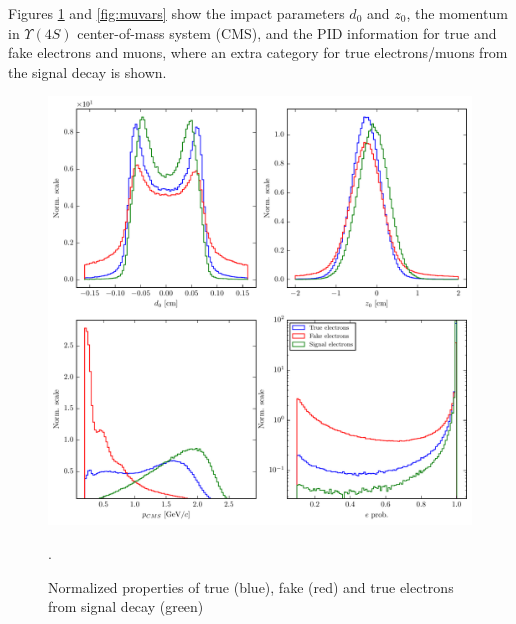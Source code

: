 \documentclass[oneside,a4paper,openany,12pt]{scrbook}
\begin{document}
Figures \ref{fig:evars} and \ref{fig:muvars} show the impact parameters $d_0$ and $z_0$, the momentum in  $\Upsilon(4S)$ center-of-mass system (CMS), and the PID information for true and fake electrons and muons, where an extra category for true electrons/muons from the signal decay is shown.

\begin{figure}[H]
\centering
\includegraphics[width=\linewidth]{fig/FSP_e_vars}
\captionsetup{width=.8\linewidth}
\caption{Normalized properties of true (blue), fake (red) and true electrons from signal decay (green)}.
\label{fig:evars}
\end{figure}
\end{document}
